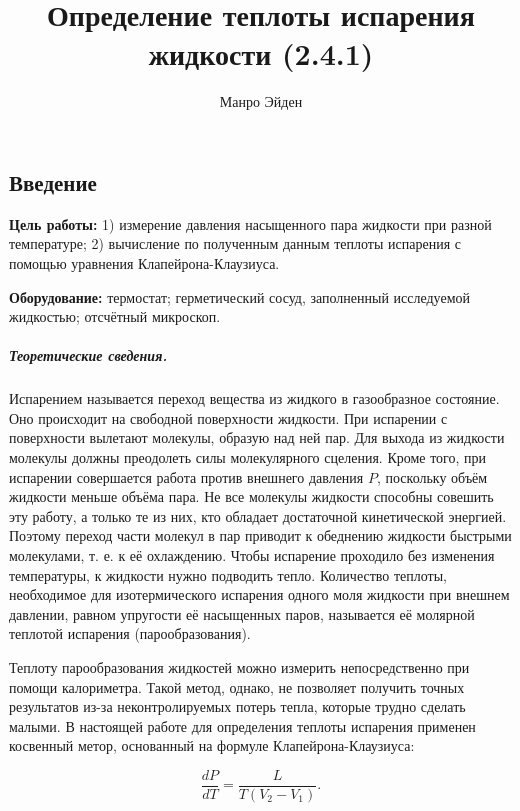 \documentclass[a4paper, 12pt]{article}
\title{\textbf{Определение теплоты испарения жидкости (2.4.1)}}
\author{Манро Эйден}
\date{}
\begin{document}
\maketitle

\begin{center}
    \section*{Введение}
\end{center}

\noindent \textbf{Цель работы:} 1) измерение давления насыщенного пара жидкости при разной температуре; 2) вычисление по полученным данным теплоты испарения с помощью уравнения Клапейрона-Клаузиуса. 
\bigskip

\noindent \textbf{Оборудование:} термостат; герметический сосуд, заполненный исследуемой жидкостью; отсчётный микроскоп. 

\bigskip

\subparagraph*{Теоретические сведения.} 

Испарением называется переход вещества из жидкого в газообразное состояние. Оно происходит на свободной поверхности жидкости. При испарении с поверхности вылетают молекулы, образую над ней пар. Для выхода из жидкости молекулы должны преодолеть силы молекулярного сцеления. Кроме того, при испарении совершается работа против внешнего давления $P$, поскольку объём жидкости меньше объёма пара. Не все молекулы жидкости способны совешить эту работу, а только те из них, кто обладает достаточной кинетической энергией. Поэтому переход части молекул в пар приводит к обеднению жидкости быстрыми молекулами, т. е. к её охлаждению. Чтобы испарение проходило без изменения температуры, к жидкости нужно подводить тепло. Количество теплоты, необходимое для изотермического испарения одного моля жидкости при внешнем давлении, равном упругости её насыщенных паров, называется её молярной теплотой испарения (парообразования). 

Теплоту парообразования жидкостей можно измерить непосредственно при помощи калориметра. Такой метод, однако, не позволяет получить точных результатов из-за неконтролируемых потерь тепла, которые трудно сделать малыми. В настоящей работе для определения теплоты испарения применен косвенный метор, основанный на формуле Клапейрона-Клаузиуса: 

\bigskip

\begin{equation} \label{kk}
 	\dfrac{dP}{dT}= \dfrac{L}{T(V_2 - V_1)}. 
\end{equation}
\end{document}
